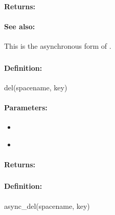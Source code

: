 \paragraph{Returns:}


\paragraph{See also:}  This is the asynchronous form of .

\pagebreak
\subsubsection{}
\label{api:ruby:del}


\paragraph{Definition:}
\begin{rubycode}
del(spacename, key)
\end{rubycode}

\paragraph{Parameters:}
\begin{itemize}[noitemsep]
\item {}\\

\item {}\\

\end{itemize}

\paragraph{Returns:}


\pagebreak
\subsubsection{}
\label{api:ruby:async_del}


\paragraph{Definition:}
\begin{rubycode}
async_del(spacename, key)
\end{rubycode}

